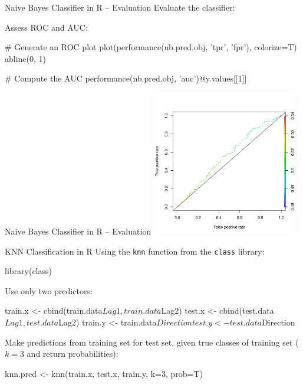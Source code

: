 \documentclass[ignorenonframetext,xcolor=x11names]{beamer}
\begin{document}
\begin{frame}[fragile]{Naive Bayes Classifier in R -- Evaluation}
\small
Evaluate the classifier:
Assess ROC and AUC:
\begin{Rcode}
# Generate an ROC plot
plot(performance(nb.pred.obj, 'tpr', 'fpr'), 
         colorize=T)
abline(0, 1)

# Compute the AUC
performance(nb.pred.obj, 'auc')@y.values[[1]]
\end{Rcode}
\end{frame}

\begin{frame}{Naive Bayes Classifier in R -- Evaluation}
\centering
\includegraphics[height=2.5in]{nb_roc.pdf}
\end{frame}

\begin{frame}[fragile]{KNN Classification in R}
\small
Using the \texttt{knn} function from the \texttt{class} library:
\begin{Rcode}
library(class)
\end{Rcode}
Use only two predictors:
\begin{Rcode}
train.x <- cbind(train.data$Lag1, train.data$Lag2)
test.x <- cbind(test.data$Lag1, test.data$Lag2)
train.y <- train.data$Direction
test.y <- test.data$Direction
\end{Rcode}
Make predictions from training set for test set, given true classes of training set ($k=3$ and return probabilities):
\begin{Rcode}
knn.pred <- knn(train.x, test.x, train.y, k=3, prob=T)
\end{Rcode}
\end{frame}
\end{document}
